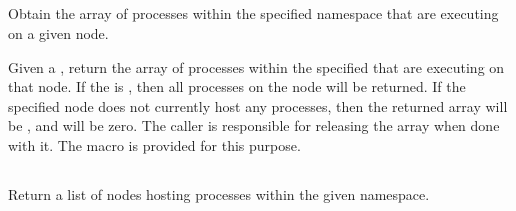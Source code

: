 \subsection{}

\summary

Obtain the array of processes within the specified namespace that are executing on a given node.

\format


\begin{arglist}
\end{arglist}

\returnsimple

\descr

Given a , return the array of processes within the specified 
that are executing on that node.
If the  is , then all processes on the node will be returned.
If the specified node does not currently host any processes, then the returned array will be , and  will be zero.
The caller is responsible for releasing the  array when done with it.
The  macro is provided for this purpose.


\subsection{}

\summary

Return a list of nodes hosting processes within the given namespace.

